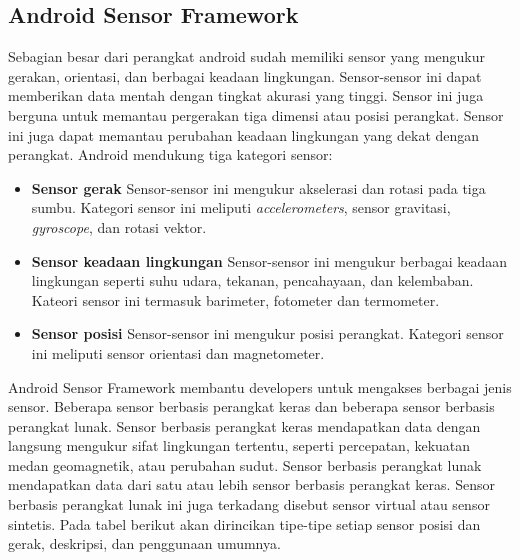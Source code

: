 \subsection{Android Sensor Framework}
\label{sec:android_sensor_framework}
Sebagian besar dari perangkat android sudah memiliki sensor yang mengukur gerakan, orientasi, dan berbagai keadaan lingkungan. Sensor-sensor ini dapat memberikan data mentah dengan tingkat akurasi yang tinggi. Sensor ini juga berguna untuk memantau pergerakan tiga dimensi atau posisi perangkat. Sensor ini juga dapat memantau perubahan keadaan lingkungan yang dekat dengan perangkat. 
Android mendukung tiga kategori sensor:
\begin{itemize}
	\item \textbf{Sensor gerak}
	Sensor-sensor ini mengukur akselerasi dan rotasi pada tiga sumbu. Kategori sensor ini meliputi \textit{accelerometers}, sensor gravitasi, \textit{gyroscope}, dan rotasi vektor. 
	\item \textbf{Sensor keadaan lingkungan}
	Sensor-sensor ini mengukur berbagai keadaan lingkungan seperti suhu udara, tekanan, pencahayaan, dan kelembaban. Kateori sensor ini termasuk barimeter, fotometer dan termometer.
	\item \textbf{Sensor posisi}
	Sensor-sensor ini mengukur posisi perangkat. Kategori sensor ini meliputi sensor orientasi dan magnetometer.
\end{itemize}
Android Sensor Framework membantu developers untuk mengakses berbagai jenis sensor. Beberapa sensor berbasis perangkat keras dan beberapa sensor berbasis perangkat lunak. Sensor berbasis perangkat keras mendapatkan data dengan langsung mengukur sifat lingkungan tertentu, seperti percepatan, kekuatan medan geomagnetik, atau perubahan sudut. Sensor berbasis perangkat lunak mendapatkan data dari satu atau lebih sensor berbasis perangkat keras. Sensor berbasis perangkat lunak ini juga terkadang disebut sensor virtual atau sensor sintetis. Pada tabel berikut akan dirincikan tipe-tipe setiap sensor posisi dan gerak, deskripsi, dan penggunaan umumnya.

